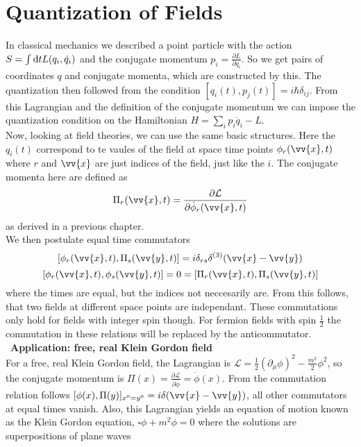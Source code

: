 \documentclass{include/thesisclass}
\newcommand{\LL}{\mathcal{L}}
\newcommand{\vx}{\vv{x}}
\newcommand{\vy}{\vv{y}}
\newcommand{\dd}{{\rm d}}
\newcommand{\p}{\partial}
\newcommand{\sub}[1]{~\newline\newline\textbf{#1}\\}
\begin{document}
    \FrontMatter

    
    
    \begingroup \let\clearpage\relax    %
    \tableofcontents                    %
    \endgroup



    \MainMatter







\chapter{Quantization of Fields}

In classical mechanics we described a point particle with the action $S = \int \dd t L(q_i, \dot{q}_i)$ and the conjugate momentum $p_i = \frac{\p L}{\p \dot{q}_i}$. So we get pairs of coordinates $q$ and conjugate momenta, which are constructed by this. The quantization then followed from the condition $[q_i(t), p_j(t)] = i \hbar \delta_{ij}$. From this Lagrangian and the definition of the conjugate momentum we can impose the quantization condition on the Hamiltonian $H = \sum_i p_i \dot{q}_i - L$.\\
Now, looking at field theories, we can use the same basic structures. Here the $q_i(t)$ correspond to te vaules of the field at space time points $\phi_r(\vx,t)$ where $r$ and $\vx$ are just indices of the field, just like the $i$. The conjugate momenta here are defined as 
\[ \Pi_r(\vx, t) = \frac{\p \LL}{\p \dot{\phi}_r(\vx,t)}\]
as derived in a previous chapter.\\
We then postulate equal time commutators
\[ [\phi_r(\vx, t) , \Pi_s(\vy, t) ] = i \delta_{rs} \delta^{(3)}(\vx - \vy)\]
\[ [ \phi_r(\vx, t) , \phi_s( \vy, t) ] = 0 = [ \Pi_r(\vx, t), \Pi_s(\vy,t)]\]
where the times are equal, but the indices not neccesarily are. From this follows, that two fields at different space points are independant. These commutations only hold for fields with integer spin though. For fermion fields with spin $\frac{1}{2}$ the commutation in these relations will be replaced by the anticommutator.
\sub{Application: free, real Klein Gordon field}
For a free, real Klein Gordon field, the Lagrangian is $\LL = \frac{1}{2}( \p_\mu \phi)^2 - \frac{m^2}{2} \phi^2$, so the conjugate momentum is $\Pi(x) = \frac{\p \LL}{\p \dot{\phi}} = \dot{\phi}(x)$. From the commutation relation follows $[\phi(x), \Pi(y)]_{x^0=y^0} = i \delta( \vx-\vy)$, all other commutators at equal times vanish. Also, this Lagrangian yields an equation of motion known as the Klein Gordon equation, $\square \phi + m^2 \phi = 0$ where the solutions are superpositions of plane waves
\end{document}

